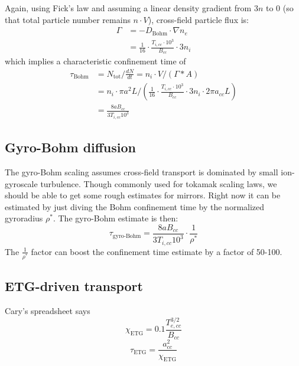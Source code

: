 Again, using Fick's law and assuming a linear density gradient from $3 n$ to 0 (so that total particle number remains $n \cdot V$), cross-field particle flux is:
\begin{align}
    \Gamma &= - D_\text{Bohm} \cdot \nabla n_e \\
    & = \frac{1}{16} \cdot \frac{T_{i,cc} \cdot 10^3}{B_{cc}} \cdot 3 n_i
\end{align}
which implies a characteristic confinement time of
\begin{align}
    \tau_\text{Bohm} &= N_\text{tot} \bigg/ \frac{dN}{dt} = n_i \cdot V / \left(\Gamma * A\right) \\
    &= n_i \cdot \pi a^2 L \bigg/ \left(\frac{1}{16} \cdot \frac{T_{i,cc} \cdot 10^3}{B_{cc}} \cdot 3 n_i \cdot 2 \pi a_{cc} L\right) \\
    &= \frac{8 a B_{cc}}{3 T_{i,cc} 10^3}
\end{align}

\subsection{Gyro-Bohm diffusion}

The gyro-Bohm scaling assumes cross-field transport is dominated by small ion-gyroscale turbulence. Though commonly used for tokamak scaling laws, we should be able to get some rough estimates for mirrors. Right now it can be estimated by just diving the Bohm confinement time by the normalized gyroradius $\rho^*$.
The gyro-Bohm estimate is then:
\begin{equation}
    \tau_\text{gyro-Bohm} = \frac{8 a B_{cc}}{3 T_{i,cc} 10^3} \cdot \frac{1}{\rho^*}
\end{equation}
The $\frac{1}{\rho^*}$ factor can boost the confinement time estimate by a factor of 50-100. 

\subsection{ETG-driven transport}

Cary's spreadsheet says 
\begin{equation}
    \chi_\text{ETG} = 0.1 \frac{T_{e,cc}^{3/2}}{B_{cc}}
\end{equation}
\begin{equation}
    \tau_\text{ETG} = \frac{a_{cc}^2}{\chi_\text{ETG}}
\end{equation}

